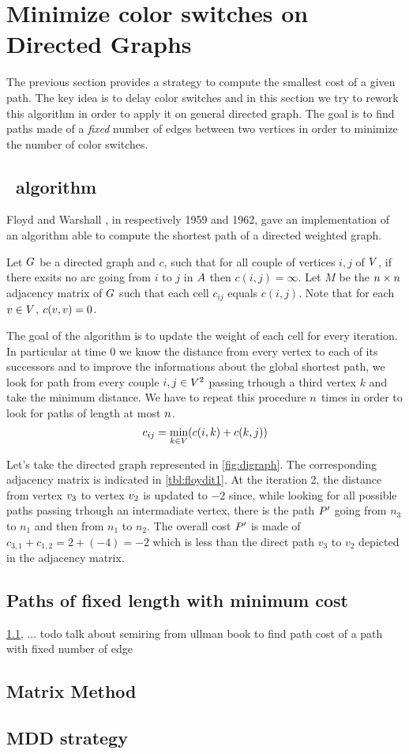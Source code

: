 \section{Minimize color switches on Directed Graphs}

The previous section provides a strategy to compute the smallest cost of a given path. The key idea is to delay color switches and in this section we try to rework this algorithm in order to apply it on general directed graph. The goal is to find paths made of a \textit{fixed} number of edges between two vertices in order to minimize the number of color switches.

\subsection{\FW\ algorithm}
\label{sec:fwalgo}

Floyd \cite[]{floyd} and Warshall \cite{warshall}, in respectively 1959 and 1962, gave an implementation \cite[]{floydalgo} of an algorithm able to compute the shortest path of a directed weighted graph.

Let $G$ be a directed graph and $c$, such that for all couple of vertices $i,j$ of $V$, if there exsits no arc going from $i$ to $j$ in $A$ then  $c(i,j) = \infty$. Let $M$ be the $n \times n$ adjacency matrix of $G$ such that each cell $c_{ij}$ equals $c(i, j)$. Note that for each $v \in V$, $c(v, v) = 0$.

The goal of the algorithm is to update the weight of each cell for every iteration. In particular at time $0$ we know the distance from every vertex to each of its successors and to improve the informations about the global shortest path, we look for path from every couple $i, j \in V^2$ passing trhough a third vertex $k$ and take the minimum distance. We have to repeat this procedure $n$ times in order to look for paths of length at most $n$.
$$c_{ij} = \min_{k \in V} (c(i, k) + c(k, j))$$





Let's take the directed graph represented in \cref{fig:digraph}. The corresponding adjacency matrix is indicated in \cref{tbl:floydit1}. At the iteration 2, the distance from vertex $v_3$ to vertex $v_2$ is updated to $-2$ since, while looking for all possible paths passing trhough an intermadiate vertex, there is the path $P'$ going from $n_3$ to $n_1$ and then from $n_1$ to $n_2$. The overall cost $P'$ is made of $c_{3,1} + c_{1,2} = 2 + (-4) = -2$ which is less than the direct path $v_3$ to $v_2$ depicted in the adjacency matrix.

\subsection{Paths of fixed length with minimum cost}

\cref{sec:fwalgo}, ... todo talk about semiring from ullman book to find path cost of a path with fixed number of edge

\subsection{Matrix Method}

\subsection{MDD strategy}